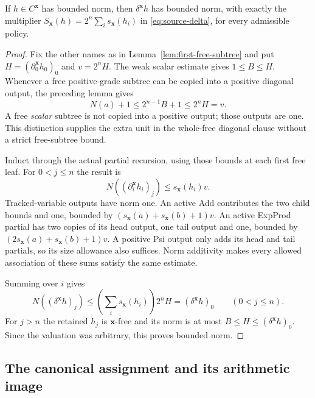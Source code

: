 \begin{theorem}
\label{thm:delta-bounded-norm}
If $h\in C^{\mathbf x}$ has bounded norm, then
$\delta^{\mathbf x}h$ has bounded norm, with exactly the multiplier
$S_{\mathbf x}(h)=2^n\sum_i s_{\mathbf x}(h_i)$ in
\eqref{eq:source-delta}, for every admissible policy.
\end{theorem}
\begin{proof}
Fix the other names as in Lemma~\ref{lem:first-free-subtree} and put
$H=(\partial_0^{\mathbf x}h_0)_0$ and $v=2^nH$.
The weak scalar estimate gives $1\le B\le H$.
Whenever a free positive-grade subtree can be copied into a positive
diagonal output, the preceding lemma gives
\[
 N(a)+1\le2^{n-1}B+1\le2^nH=v.
\]
A free \emph{scalar} subtree is not copied into a positive output;
those outputs are one.  This distinction supplies the extra unit in
the whole-free diagonal clause without a strict free-subtree bound.

Induct through the actual partial recursion, using those bounds at
each first free leaf.  For $0<j\le n$ the result is
\[
 N((\partial_i^{\mathbf x}h_i)_j)
           \le s_{\mathbf x}(h_i)v.
\]
Tracked-variable outputs have norm one.  An active Add contributes
the two child bounds and one, bounded by
$(s_{\mathbf x}(a)+s_{\mathbf x}(b)+1)v$.
An active ExpProd partial has two copies of its head output, one
tail output and one, bounded by
$(2s_{\mathbf x}(a)+s_{\mathbf x}(b)+1)v$.
A positive Psi output only adds its head and tail partials, so its
size allowance also suffices.  Norm additivity makes every allowed
association of these sums satisfy the same estimate.

Summing over $i$ gives
\[
 N((\delta^{\mathbf x}h)_j)
 \le\left(\sum_i s_{\mathbf x}(h_i)\right)2^nH
   =(\delta^{\mathbf x}h)_0\qquad(0<j\le n).
\]
For $j>n$ the retained $h_j$ is $\mathbf x$-free and its norm
is at most $B\le H\le(\delta^{\mathbf x}h)_0$.
Since the valuation was arbitrary, this proves bounded norm.
\end{proof}

\subsection{The canonical assignment and its arithmetic image}

